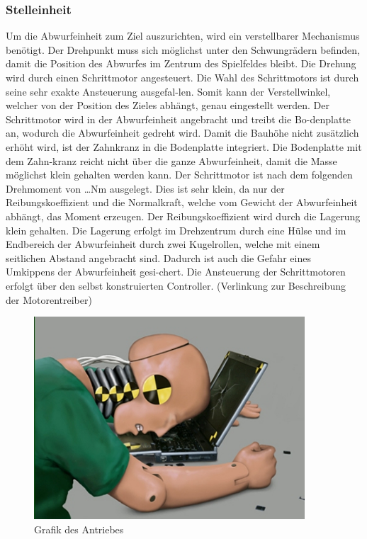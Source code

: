 \subsubsection{Stelleinheit}
Um die Abwurfeinheit zum Ziel auszurichten, wird ein verstellbarer Mechanismus benötigt. Der Drehpunkt muss sich möglichst unter den Schwungrädern befinden, damit die Position des Abwurfes im Zentrum des Spielfeldes bleibt. Die Drehung wird durch einen Schrittmotor angesteuert. Die Wahl des Schrittmotors ist durch seine sehr exakte Ansteuerung ausgefal-len. Somit kann der Verstellwinkel, welcher von der Position des Zieles abhängt, genau eingestellt werden. Der Schrittmotor wird in der Abwurfeinheit angebracht und treibt die Bo-denplatte an, wodurch die Abwurfeinheit gedreht wird. Damit die Bauhöhe nicht zusätzlich erhöht wird, ist der Zahnkranz in die Bodenplatte integriert. Die Bodenplatte mit dem Zahn-kranz reicht nicht über die ganze Abwurfeinheit, damit die Masse möglichst klein gehalten werden kann. Der Schrittmotor ist nach dem folgenden Drehmoment von …Nm ausgelegt. Dies ist sehr klein, da nur der Reibungskoeffizient und die Normalkraft, welche vom Gewicht der Abwurfeinheit abhängt, das Moment erzeugen. Der Reibungskoeffizient wird durch die Lagerung klein gehalten. Die Lagerung erfolgt im Drehzentrum durch eine Hülse und im Endbereich der Abwurfeinheit durch zwei Kugelrollen, welche mit einem seitlichen Abstand angebracht sind. Dadurch ist auch die Gefahr eines Umkippens der Abwurfeinheit gesi-chert. Die Ansteuerung der Schrittmotoren erfolgt über den selbst konstruierten Controller. (Verlinkung zur Beschreibung der Motorentreiber)

\begin{figure}
	\centering
	\includegraphics[width=0.9\textwidth]{Enddokumentation/CrashTestDummy.jpg}
	\caption{Grafik des Antriebes}
	\label{fig:Grafik des Antriebes}	
\end{figure}